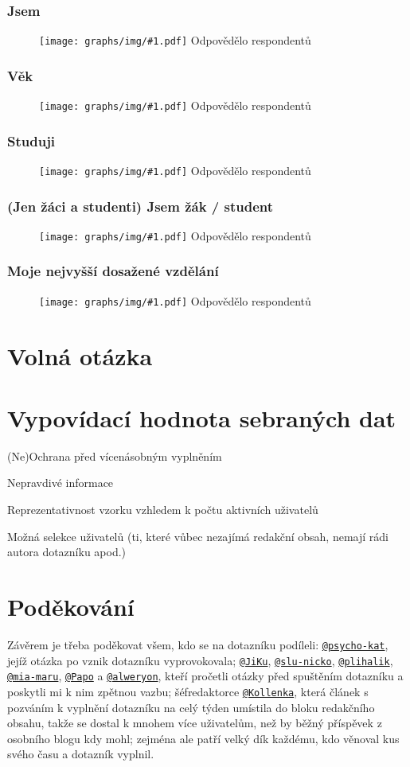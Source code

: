\documentclass[12pt, a4paper, twoside]{article}
\makeatletter
\newcommand{\suser}[1]{\href{https://www.signaly.cz/#1}{\texttt{@#1}}}
\newcommand{\answercount}[1]{Odpovědělo  respondentů}
\newcommand{\includegraph}[2]{
  \begin{figure}[H]
    \centering
    \textbf{#2}
    \texttt{[image: graphs/img/\#1.pdf]}
    \answercount{#1}
  \end{figure}
}
\makeatother
\begin{document}
\subsubsection{Jsem}

\includegraph{jsem}{}

\subsubsection{Věk}

\includegraph{vek}{}

\subsubsection{Studuji}

\includegraph{studuji}{}

\subsubsection{(Jen žáci a studenti) Jsem žák / student}

\includegraph{studuji_co}{}

\subsubsection{Moje nejvyšší dosažené vzdělání}

\includegraph{moje_nejvyssi_dosazene_vzdelani}{}

\section{Volná otázka }

\section{Vypovídací hodnota sebraných dat}

(Ne)Ochrana před vícenásobným vyplněním

Nepravdivé informace

Reprezentativnost vzorku vzhledem k počtu aktivních uživatelů

Možná selekce uživatelů (ti, které vůbec nezajímá redakční obsah,
nemají rádi autora dotazníku apod.)

\section*{Poděkování}

Závěrem je třeba poděkovat všem, kdo se na dotazníku podíleli:
\suser{psycho-kat}, jejíž otázka po 
vznik dotazníku vyprovokovala;
\suser{JiKu}, \suser{slu-nicko}, \suser{plihalik}, \suser{mia-maru},
\suser{Papo} a \suser{alweryon}, kteří pročetli otázky před spuštěním
dotazníku a poskytli mi k nim zpětnou vazbu;
šéfredaktorce \suser{Kollenka}, která článek s pozváním k vyplnění
dotazníku na celý týden umístila do bloku redakčního obsahu,
takže se dostal
k mnohem více uživatelům, než by běžný příspěvek z osobního blogu
kdy mohl;
zejména ale patří velký dík každému, kdo věnoval kus svého času
a dotazník vyplnil.

\tableofcontents

\printbibliography
\end{document}
